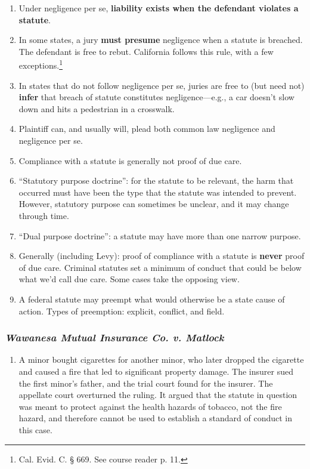 \begin{enumerate}
    \item Under negligence per se, \textbf{liability exists when the defendant 
    violates a statute}.
    \item In some states, a jury \textbf{must presume} negligence when a 
    statute is breached. The defendant is free to rebut. California follows 
    this rule, with a few exceptions.\footnote{Cal. Evid. C. § 669.  See 
    course reader p. 11.} \item In states that do not follow negligence per 
    se, juries are free to (but need not) \textbf{infer} that breach of 
    statute constitutes negligence---e.g., a car doesn't slow down and hits a 
    pedestrian in a crosswalk.
    \item Plaintiff can, and usually will, plead both common law negligence 
    and negligence per se.
    \item Compliance with a statute is generally not proof of due care.
    \item ``Statutory purpose doctrine'': for the statute to be relevant, the 
    harm that occurred must have been the type that the statute was intended 
    to prevent. However, statutory purpose can sometimes be unclear, and it 
    may change through time.
    \item ``Dual purpose doctrine'': a statute may have more than one narrow 
    purpose.
    \item Generally (including Levy): proof of compliance with a statute is 
    \textbf{never} proof of due care. Criminal statutes set a minimum of 
    conduct that could be below what we'd call due care. Some cases take the 
    opposing view.
    \item A federal statute may preempt what would otherwise be a state cause 
    of action. Types of preemption: explicit, conflict, and field.
\end{enumerate}

\subsubsection{\emph{Wawanesa Mutual Insurance Co. v. Matlock}}

\begin{enumerate}
    \item A minor bought cigarettes for another minor, who later dropped the 
    cigarette and caused a fire that led to significant property damage. The 
    insurer sued the first minor's father, and the trial court found for the 
    insurer. The appellate court overturned the ruling. It argued that the 
    statute in question was meant to protect against the health hazards of 
    tobacco, not the fire hazard, and therefore cannot be used to establish a 
    standard of conduct in this case.
\end{enumerate}

